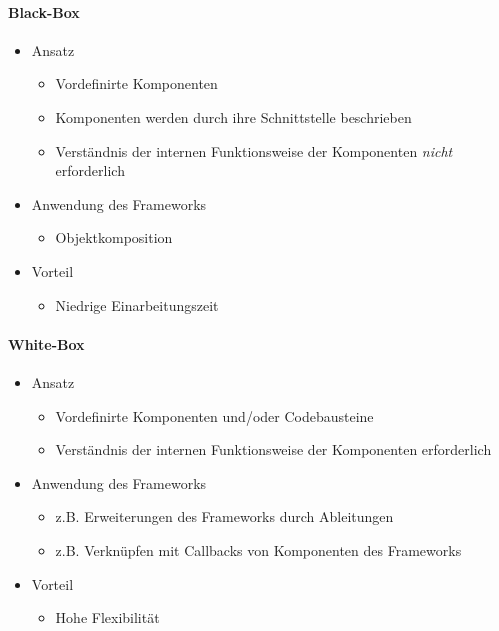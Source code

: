 \documentclass
[
	8pt,		%
	ngerman,	%
	a4paper,	%
	landscape,	%
	final		%
]{extarticle}
\begin{document}
\begin{multicols*}{4}
{\begin{multicols*}{2}
			\paragraph{Black-Box}
			\begin{itemize}
				\item Ansatz
				      \begin{itemize}[leftmargin=4pt,nolistsep]
					      \item Vordefinirte Komponenten
					      \item Komponenten werden durch ihre Schnittstelle
					            beschrieben
					      \item Verständnis der internen Funktionsweise der
					            Komponenten \emph{nicht} erforderlich
				      \end{itemize}
				\item Anwendung des Frameworks
				      \begin{itemize}[leftmargin=4pt,nolistsep]
					      \item Objektkomposition
				      \end{itemize}
				\item Vorteil
				      \begin{itemize}[leftmargin=4pt,nolistsep]
					      \item Niedrige Einarbeitungszeit
				      \end{itemize}
			\end{itemize}
			\columnbreak
			\paragraph{White-Box}
			\begin{itemize}
				\item Ansatz
				      \begin{itemize}[leftmargin=4pt,nolistsep]
					      \item Vordefinirte Komponenten und/oder Codebausteine
					      \item Verständnis der internen Funktionsweise der Komponenten
					            erforderlich
				      \end{itemize}
				\item Anwendung des Frameworks
				      \begin{itemize}[leftmargin=4pt,nolistsep]
					      \item z.B. Erweiterungen des Frameworks durch Ableitungen
					      \item z.B. Verknüpfen mit Callbacks von Komponenten des Frameworks
				      \end{itemize}
				\item Vorteil
				      \begin{itemize}[leftmargin=4pt,nolistsep]
					      \item Hohe Flexibilität
				      \end{itemize}
			\end{itemize}
		\end{multicols*}
	}

\end{multicols*}
\end{document}
